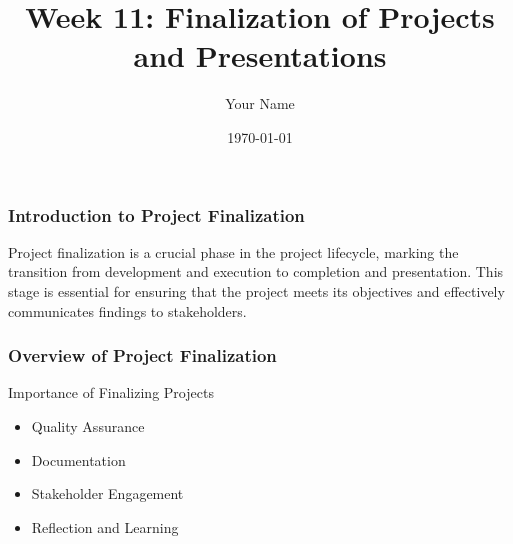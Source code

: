 \documentclass{beamer}
\title{Week 11: Finalization of Projects and Presentations}
\author{Your Name}
\institute{Your Institution}
\date{\today}
\begin{document}
\frame{\titlepage}

\begin{frame}[fragile]
    \frametitle{Introduction to Project Finalization}
    Project finalization is a crucial phase in the project lifecycle, marking the transition from development and execution to completion and presentation. This stage is essential for ensuring that the project meets its objectives and effectively communicates findings to stakeholders.
\end{frame}

\begin{frame}[fragile]
    \frametitle{Overview of Project Finalization}
    \begin{block}{Importance of Finalizing Projects}
        \begin{itemize}
            \item Quality Assurance
            \item Documentation
            \item Stakeholder Engagement
            \item Reflection and Learning
        \end{itemize}
    \end{block}
\end{frame}
\end{document}
